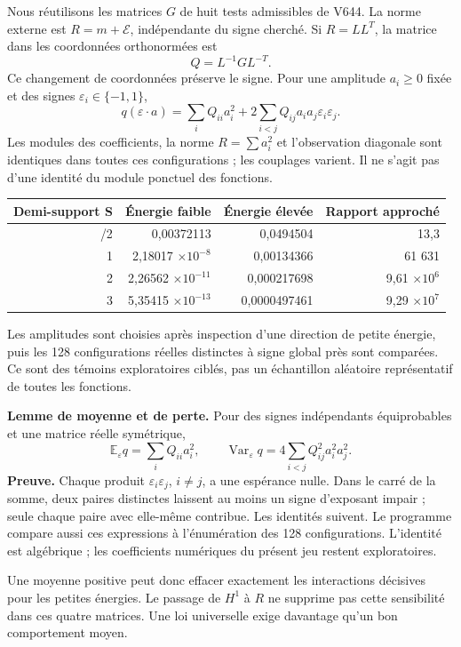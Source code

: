 \documentclass[
  11pt,
]{article}
\begin{document}
Nous réutilisons les matrices \(G\) de huit tests admissibles de V644.
La norme externe est \(R=m+\mathcal E\), indépendante du signe cherché.
Si \(R=LL^T\), la matrice dans les coordonnées orthonormées est \[
Q=L^{-1}GL^{-T}.
\] Ce changement de coordonnées préserve le signe. Pour une amplitude
\(a_i\ge0\) fixée et des signes \(\varepsilon_i\in\{-1,1\}\), \[
q(\varepsilon\cdot a)=\sum_i Q_{ii}a_i^2
 +2\sum_{i<j}Q_{ij}a_ia_j\varepsilon_i\varepsilon_j.
\] Les modules des coefficients, la norme \(R=\sum a_i^2\) et
l'observation diagonale sont identiques dans toutes ces configurations ;
les couplages varient. Il ne s'agit pas d'une identité du module
ponctuel des fonctions.

\begin{longtable}[]{@{}rrrr@{}}
\toprule\noalign{}
Demi-support S & Énergie faible & Énergie élevée & Rapport approché \\
\midrule\noalign{}
\endhead
\bottomrule\noalign{}
\endlastfoot
1/2 & 0,00372113 & 0,0494504 & 13,3 \\
1 & 2,18017 \(\times 10^{-8}\) & 0,00134366 & 61 631 \\
2 & 2,26562 \(\times 10^{-11}\) & 0,000217698 & 9,61 \(\times 10^6\) \\
3 & 5,35415 \(\times 10^{-13}\) & 0,0000497461 & 9,29 \(\times 10^7\) \\
\end{longtable}

Les amplitudes sont choisies après inspection d'une direction de petite
énergie, puis les 128 configurations réelles distinctes à signe global
près sont comparées. Ce sont des témoins exploratoires ciblés, pas un
échantillon aléatoire représentatif de toutes les fonctions.

\textbf{Lemme de moyenne et de perte.} Pour des signes indépendants
équiprobables et une matrice réelle symétrique, \[
\mathbb E_\varepsilon q=\sum_iQ_{ii}a_i^2,
\qquad
\operatorname{Var}_\varepsilon q=4\sum_{i<j}Q_{ij}^2a_i^2a_j^2.
\] \textbf{Preuve.} Chaque produit \(\varepsilon_i\varepsilon_j\),
\(i\ne j\), a une espérance nulle. Dans le carré de la somme, deux
paires distinctes laissent au moins un signe d'exposant impair ; seule
chaque paire avec elle-même contribue. Les identités suivent. Le
programme compare aussi ces expressions à l'énumération des 128
configurations. L'identité est algébrique ; les coefficients numériques
du présent jeu restent exploratoires.

Une moyenne positive peut donc effacer exactement les interactions
décisives pour les petites énergies. Le passage de \(H^1\) à \(R\) ne
supprime pas cette sensibilité dans ces quatre matrices. Une loi
universelle exige davantage qu'un bon comportement moyen.
\end{document}
